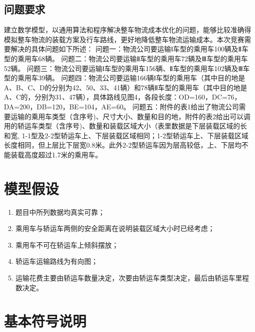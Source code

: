 \documentclass[UTF8]{ctexart}
\begin{document}


\subsection{问题要求}
建立数学模型，以通用算法和程序解决整车物流成本优化的问题，能够比较准确得模拟整车物流的装载方案及行车路线，更好地降低整车物流运输成本。本次竞赛需要解决的具体问题如下所述：
问题一：物流公司要运输Ⅰ车型的乘用车100辆及Ⅱ车型的乘用车68辆。
问题二：物流公司要运输Ⅱ车型的乘用车72辆及Ⅲ车型的乘用车52辆。
问题三：物流公司要运输Ⅰ车型的乘用车156辆、Ⅱ车型的乘用车102辆及Ⅲ车型的乘用车39辆。
问题四：物流公司要运输166辆Ⅰ车型的乘用车（其中目的地是A、B、C、D的分别为42、50、33、41辆）和78辆Ⅱ车型的乘用车（其中目的地是A、C的，分别为31、47辆），具体路线见图4，各段长度：OD=160，DC=76，DA=200，DB=120，BE=104，AE=60。
问题五：附件的表1给出了物流公司需要运输的乘用车类型（含序号)、尺寸大小、数量和目的地，附件的表2给出可以调用的轿运车类型（含序号)、数量和装载区域大小（表里数据是下层装载区域的长和宽, 1-1型及2-2型轿运车上、下层装载区域相同；1-2型轿运车上、下层装载区域长度相同，但上层比下层宽0.8米。此外2-2型轿运车因为层高较低，上、下层均不能装载高度超过1.7米的乘用车。

\section{模型假设}
\begin{enumerate}
	\item 	题目中所列数据均真实可靠；
	\item	乘用车与轿运车两侧的安全距离在说明装载区域大小时已经考虑；
	\item	乘用车不可在轿运车上倾斜摆放；
	\item	轿运车运输路线为有向图；
	\item	运输花费主要由轿运车数量决定，次要由轿运车类型决定，最后由轿运车里程数决定。

\end{enumerate}

\section{基本符号说明}
\label{sec:symbols}
\end{document}
